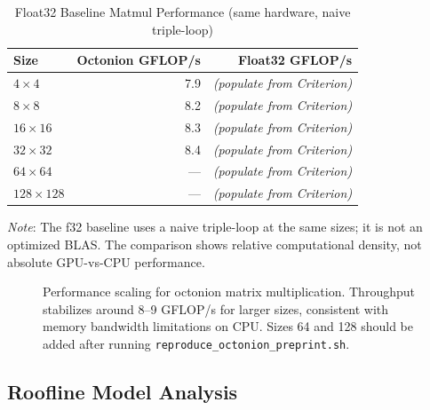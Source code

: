 \documentclass[11pt,a4paper]{article}
\begin{document}
\begin{table}[h]
\centering
\caption{Float32 Baseline Matmul Performance (same hardware, naive triple-loop)}
\label{tab:f32baseline}
\begin{tabular}{@{}lrr@{}}
\toprule
Size & Octonion GFLOP/s & Float32 GFLOP/s \\
\midrule
$4\times4$ & 7.9 & \textit{(populate from Criterion)} \\
$8\times8$ & 8.2 & \textit{(populate from Criterion)} \\
$16\times16$ & 8.3 & \textit{(populate from Criterion)} \\
$32\times32$ & 8.4 & \textit{(populate from Criterion)} \\
$64\times64$ & --- & \textit{(populate from Criterion)} \\
$128\times128$ & --- & \textit{(populate from Criterion)} \\
\bottomrule
\end{tabular}
\end{table}

\textit{Note}: The f32 baseline uses a naive triple-loop at the same sizes; it is not an optimized BLAS. The comparison shows relative computational density, not absolute GPU-vs-CPU performance.

\begin{figure}[h]
\centering
{}
\caption{Performance scaling for octonion matrix multiplication. Throughput stabilizes around 8--9 GFLOP/s for larger sizes, consistent with memory bandwidth limitations on CPU. Sizes 64 and 128 should be added after running \texttt{reproduce\_octonion\_preprint.sh}.}
\label{fig:performance}
\end{figure}

\subsection{Roofline Model Analysis}
\end{document}
